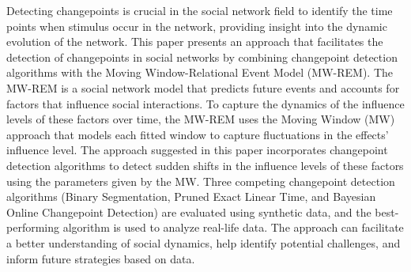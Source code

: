 \documentclass[]{interact}
\theoremstyle{plain}%
\theoremstyle{definition}
\theoremstyle{remark}
\begin{document}
	Detecting changepoints is crucial in the social network field to identify the time points when stimulus occur in the network, providing insight into the dynamic evolution of the network. This paper presents an approach that facilitates the detection of changepoints in social networks by combining changepoint detection algorithms with the Moving Window-Relational Event Model (MW-REM). The MW-REM is a social network model that predicts future events and accounts for factors that influence social interactions. To capture the dynamics of the influence levels of these factors over time, the MW-REM uses the Moving Window (MW) approach that models each fitted window to capture fluctuations in the effects' influence level. The approach suggested in this paper incorporates changepoint detection algorithms to detect sudden shifts in the influence levels of these factors using the parameters given by the MW. Three competing changepoint detection algorithms (Binary Segmentation, Pruned Exact Linear Time, and Bayesian Online Changepoint Detection) are evaluated using synthetic data, and the best-performing algorithm is used to analyze real-life data. The approach can facilitate a better understanding of social dynamics, help identify potential challenges, and inform future strategies based on data. \\
	
\end{document}

